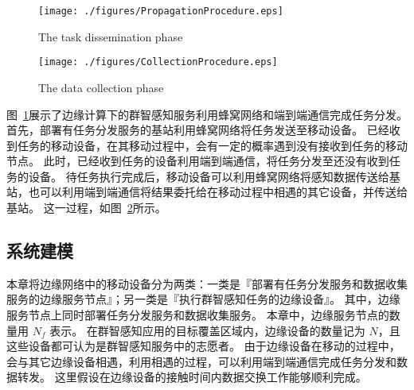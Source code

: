\begin{figure}[!h]
  \centering
  \vspace{-1em}
  \texttt{[image: ./figures/PropagationProcedure.eps]}
  \vspace{-1em}
  \caption{The task dissemination phase}
  \label{Figure_PropagationProcedure}
\end{figure}

\begin{figure}[!h]
  \centering
  \texttt{[image: ./figures/CollectionProcedure.eps]}
  \vspace{-1em}
  \caption{The data collection phase}
  \vspace{-1.5em}
  \label{Figure_FeedbacksCollection}
\end{figure}

图~\ref{Figure_PropagationProcedure}展示了边缘计算下的群智感知服务利用蜂窝网络和端到端通信完成任务分发。
首先，部署有任务分发服务的基站利用蜂窝网络将任务发送至移动设备。
已经收到任务的移动设备，在其移动过程中，会有一定的概率遇到没有接收到任务的移动节点。
此时，已经收到任务的设备利用端到端通信，将任务分发至还没有收到任务的设备。
待任务执行完成后，移动设备可以利用蜂窝网络将感知数据传送给基站，也可以利用端到端通信将结果委托给在移动过程中相遇的其它设备，并传送给基站。
这一过程，如图~\ref{Figure_FeedbacksCollection}所示。

\subsection{系统建模}

本章将边缘网络中的移动设备分为两类：一类是『部署有任务分发服务和数据收集服务的边缘服务节点』；另一类是『执行群智感知任务的边缘设备』。
其中，边缘服务节点上同时部署任务分发服务和数据收集服务。
本章中，边缘服务节点的数量用 $N_f$ 表示。
在群智感知应用的目标覆盖区域内，边缘设备的数量记为 $N$，且这些设备都可认为是群智感知服务中的志愿者。
由于边缘设备在移动的过程中，会与其它边缘设备相遇，利用相遇的过程，可以利用端到端通信完成任务分发和数据转发。
这里假设在边缘设备的接触时间内数据交换工作能够顺利完成。

